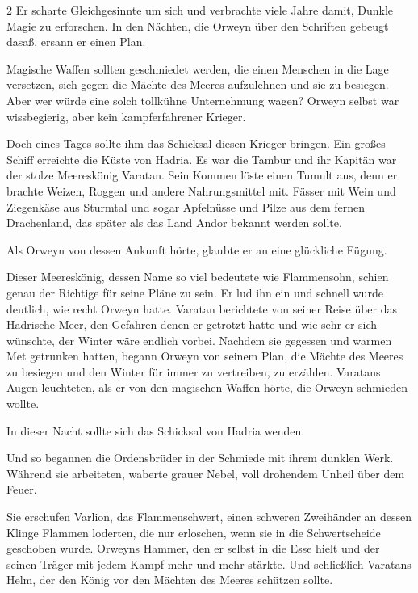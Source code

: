 \documentclass[10pt, a4paper, oneside]{book}
\begin{document}
\begin{multicols}{2}
Er scharte Gleichgesinnte um sich und verbrachte viele Jahre damit, Dunkle Magie zu erforschen. In den Nächten, die Orweyn über den Schriften gebeugt dasaß, ersann er einen Plan.\bigskip

Magische Waffen sollten geschmiedet werden, die einen Menschen in die Lage versetzen, sich gegen die Mächte des Meeres aufzulehnen und sie zu besiegen. Aber wer würde eine solch tollkühne Unternehmung wagen? Orweyn selbst war wissbegierig, aber kein kampferfahrener Krieger.\bigskip

Doch eines Tages sollte ihm das Schicksal diesen Krieger bringen. Ein großes Schiff erreichte die Küste von Hadria. Es war die Tambur und ihr Kapitän war der stolze Meereskönig Varatan. Sein Kommen löste einen Tumult aus, denn er brachte Weizen, Roggen und andere Nahrungsmittel mit. Fässer mit Wein und Ziegenkäse aus Sturmtal und sogar Apfelnüsse und Pilze aus dem fernen Drachenland, das später als das Land Andor bekannt werden sollte.\bigskip

Als Orweyn von dessen Ankunft hörte, glaubte er an eine glückliche Fügung.\bigskip

Dieser Meereskönig, dessen Name so viel bedeutete wie Flammensohn, schien genau der Richtige für seine Pläne zu sein. Er lud ihn ein und schnell wurde deutlich, wie recht Orweyn hatte. Varatan berichtete von seiner Reise über das Hadrische Meer, den Gefahren denen er getrotzt hatte und wie sehr er sich wünschte, der Winter wäre endlich vorbei. Nachdem sie gegessen und warmen Met getrunken hatten, begann Orweyn von seinem Plan, die Mächte des Meeres zu besiegen und den Winter für immer zu vertreiben, zu erzählen. Varatans Augen leuchteten, als er von den magischen Waffen hörte, die Orweyn schmieden wollte.\bigskip

In dieser Nacht sollte sich das Schicksal von Hadria wenden.\bigskip



Und so begannen die Ordensbrüder in der Schmiede mit ihrem dunklen Werk.  Während sie arbeiteten, waberte grauer Nebel, voll drohendem Unheil über dem Feuer.\bigskip

Sie erschufen Varlion, das Flammenschwert, einen schweren Zweihänder an dessen Klinge Flammen loderten, die nur erloschen, wenn sie in die Schwertscheide geschoben wurde. Orweyns Hammer, den er selbst in die Esse hielt und der seinen Träger mit jedem Kampf mehr und mehr stärkte. Und schließlich Varatans Helm, der den König vor den Mächten des Meeres schützen sollte.\bigskip


\end{multicols}
\end{document}
